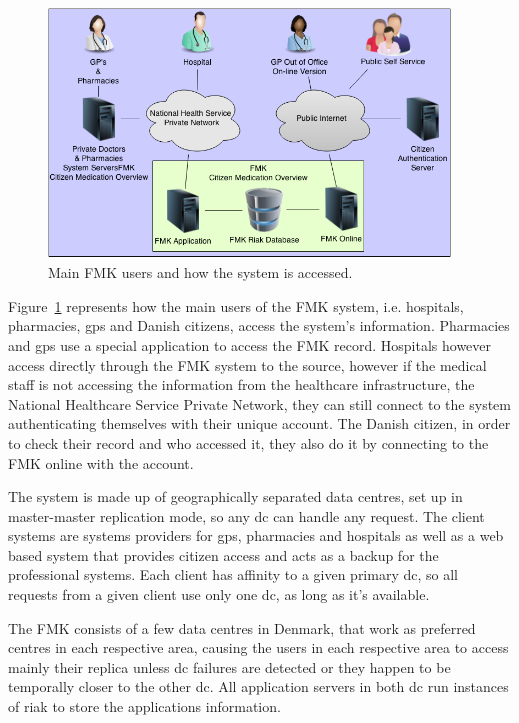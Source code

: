 \documentclass[english]{article}
\begin{document}
\begin{figure}[!ht]
	\centering
	\includegraphics[width=0.95\textwidth]{./figures/FMK_layout.png}

	\caption{Main FMK users and how the system is accessed.}
	\label{fig:fmk_layout}
\end{figure}
Figure~\ref{fig:fmk_layout} represents how the main users of the FMK system, i.e. hospitals, pharmacies, \glspl{gp} and Danish citizens, access the system's information. Pharmacies and \glspl{gp} use a special application to access the FMK record. Hospitals however access directly through the FMK system to the source, however if the medical staff is not accessing the information from the healthcare infrastructure, the National Healthcare Service Private Network, they can still  connect to the system authenticating themselves with their unique account. The Danish citizen, in order to check their record and who accessed it, they also do it by connecting to the FMK online with the account.


The system is made up of geographically separated data centres, set up in master-master replication mode, so any \gls{dc} can handle any request. The client systems are systems providers for \glspl{gp}, pharmacies and hospitals as well as a web based system that provides citizen access and acts as a backup for the professional systems. Each client has affinity to a given primary \gls{dc}, so all requests from a given client use only one
\gls{dc}, as long as it's available.

The FMK consists of a few data centres in Denmark, that work as preferred centres in each respective area, causing the users in each respective area to access mainly their replica unless \gls{dc} failures are detected or they happen to be temporally closer to the other \gls{dc}. All application servers in both \gls{dc} run instances of riak to store the applications information. 
\end{document}
